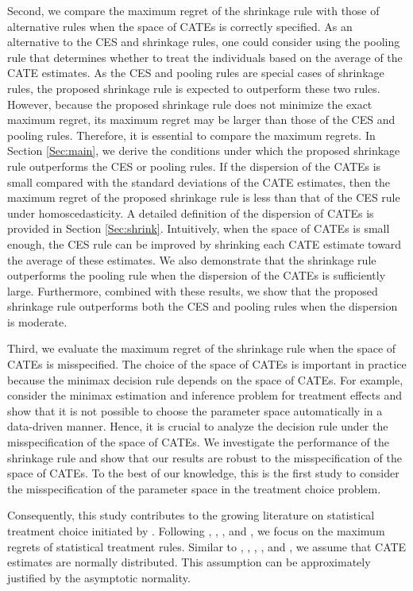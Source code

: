 \documentclass[12pt,a4paper]{article}
\begin{document}
Second, we compare the maximum regret of the shrinkage rule with those of alternative rules when the space of CATEs is correctly specified. As an alternative to the CES and shrinkage rules, one could consider using the pooling rule that determines whether to treat the individuals based on the average of the CATE estimates. As the CES and pooling rules are special cases of shrinkage rules, the proposed shrinkage rule is expected to outperform these two rules. However, because the proposed shrinkage rule does not minimize the exact maximum regret, its maximum regret may be larger than those of the CES and pooling rules. Therefore, it is essential to compare the maximum regrets. In Section \ref{Sec:main}, we derive the conditions under which the proposed shrinkage rule outperforms the CES or pooling rules. If the dispersion of the CATEs is small compared with the standard deviations of the CATE estimates, then the maximum regret of the proposed shrinkage rule is less than that of the CES rule under homoscedasticity. A detailed definition of the dispersion of CATEs is provided in Section \ref{Sec:shrink}. Intuitively, when the space of CATEs is small enough, the CES rule can be improved by shrinking each CATE estimate toward the average of these estimates. We also demonstrate that the shrinkage rule outperforms the pooling rule when the dispersion of the CATEs is sufficiently large. Furthermore, combined with these results, we show that the proposed shrinkage rule outperforms both the CES and pooling rules when the dispersion is moderate.

Third, we evaluate the maximum regret of the shrinkage rule when the space of CATEs is misspecified. The choice of the space of CATEs is important in practice because the minimax decision rule depends on the space of CATEs. For example, \cite{armstrong2018optimal,armstrong2021finite} consider the minimax estimation and inference problem for treatment effects and show that it is not possible to choose the parameter space automatically in a data-driven manner. Hence, it is crucial to analyze the decision rule under the misspecification of the space of CATEs. We investigate the performance of the shrinkage rule and show that our results are robust to the misspecification of the space of CATEs. To the best of our knowledge, this is the first study to consider the misspecification of the parameter space in the treatment choice problem.

Consequently, this study contributes to the growing literature on statistical treatment choice initiated by \cite{manski2000identification, manski2004statistical}. Following \cite{manski2004statistical, manski2007minimax}, \cite{hirano2009asymptotics}, \cite{stoye2009minimax, stoye2012minimax}, and \cite{tetenov2012statistical}, we focus on the maximum regrets of statistical treatment rules. Similar to \cite{stoye2012minimax}, \cite{tetenov2012statistical}, \cite{ishihara2021evidence}, \cite{olea2023decision}, and \cite{yata2021optimal}, we assume that CATE estimates are normally distributed. This assumption can be approximately justified by the asymptotic normality.
\end{document}
